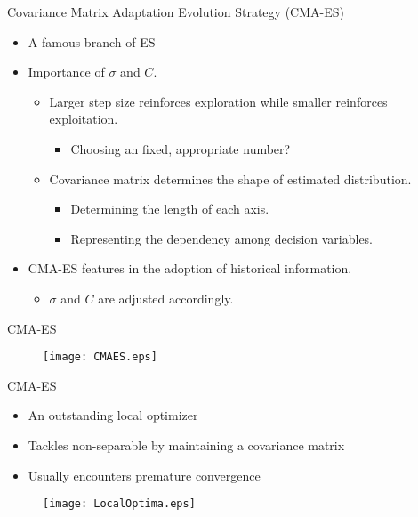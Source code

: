 \begin{frame}{Covariance Matrix Adaptation Evolution Strategy (CMA-ES)}
  \begin{itemize}
    \item A famous branch of ES
      \vspace*{14pt}
    \item Importance of $\sigma$ and $C$.
      \begin{itemize}
        \item Larger step size reinforces exploration while smaller
          reinforces exploitation.
          \begin{itemize}
            \item Choosing an fixed, appropriate number?
          \end{itemize}
        \item Covariance matrix determines the shape of estimated
          distribution.
          \begin{itemize}
            \item Determining the length of each axis.
            \item Representing the dependency among decision variables.
          \end{itemize}
      \end{itemize}
      \vspace*{14pt}
    \item CMA-ES features in the adoption of historical information.
      \begin{itemize}
        \item $\sigma$ and $C$ are adjusted accordingly.
      \end{itemize}
  \end{itemize}
\end{frame}

\begin{frame}{CMA-ES}
  \begin{figure}[t]
    \texttt{[image: CMAES.eps]}
  \end{figure}
\end{frame}

\begin{frame}{CMA-ES}
  \begin{itemize}
    \item An outstanding local optimizer
    \item Tackles \alert{non-separable} by maintaining a
      covariance matrix
    \item Usually encounters premature convergence
  \end{itemize}
  \begin{figure}[htpb]
    \centering
    \vfill\texttt{[image: LocalOptima.eps]}
  \end{figure}
\end{frame}

